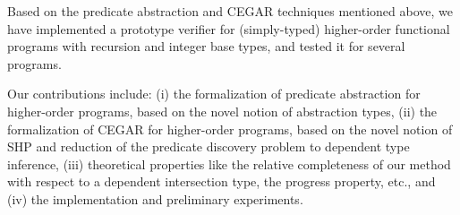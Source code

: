 
Based on the predicate abstraction and CEGAR techniques mentioned above, 
we have implemented a prototype verifier for (simply-typed) higher-order 
functional programs with recursion and integer base types, and tested it 
for several programs.

Our contributions include: (i) the formalization of predicate 
abstraction for higher-order programs, based on the novel notion of 
abstraction types, (ii) the formalization of CEGAR for higher-order 
programs, based on the novel notion of SHP and reduction of the 
predicate discovery problem to dependent type inference, (iii) 
theoretical properties like the relative completeness of our method with 
respect to a dependent intersection type, the progress property, etc., 
and (iv) the implementation and preliminary experiments.

